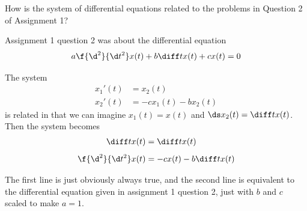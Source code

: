 \documentclass[a4paper]{article}
\begin{document}
\subsection{~} %

\begin{questionbody}
How is the system of differential equations related to the problems in Question 2 of Assignment 1?
\end{questionbody}

Assignment 1 question 2 was about the differential equation \[ a \f{\d^2}{\d t^2}x(t) + b \diff t x(t) + cx(t) = 0 \]

The system \begin{align*}
    x_1'(t) &= x_2(t) \\[1ex]
    x_2'(t) &= -c x_1(t) - b x_2(t)
\end{align*}is related in that we can imagine $x_1(t) = x(t)$ and $\ds x_2(t) = \diff t x(t)$. Then the system becomes \begin{align*}
    \diff t x(t)          &= \diff t x(t) \\[1ex]
    \f{\d^2}{\d t^2} x(t) &= -c x(t) - b \diff t x(t)
\end{align*}

The first line is just obviously always true, and the second line is equivalent to the differential equation given in assignment 1 question 2, just with $b$ and $c$ scaled to make $a=1$.
\end{document}
